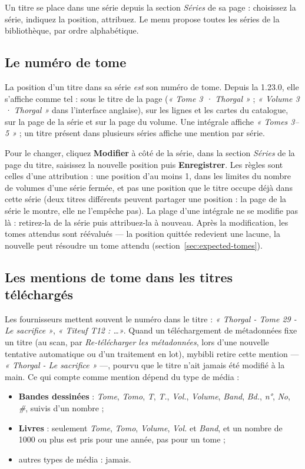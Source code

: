 Un titre se place dans une série depuis la section \emph{Séries} de sa
page : choisissez la série, indiquez la position, attribuez. Le menu
propose toutes les séries de la bibliothèque, par ordre alphabétique.

\subsection*{Le numéro de tome}

La position d'un titre dans sa série \emph{est} son numéro de tome.
Depuis la 1.23.0, elle s'affiche comme tel : sous le titre de la page
(\emph{« Tome 3 · Thorgal »} ; \emph{« Volume 3 · Thorgal »} dans
l'interface anglaise), sur les lignes et les cartes du catalogue, sur
la page de la série et sur la page du volume. Une intégrale affiche
\emph{« Tomes 3--5 »} ; un titre présent dans plusieurs séries affiche
une mention par série.

Pour le changer, cliquez \textbf{Modifier} à côté de la série, dans la
section \emph{Séries} de la page du titre, saisissez la nouvelle
position puis \textbf{Enregistrer}. Les règles sont celles d'une
attribution : une position d'au moins 1, dans les limites du nombre de
volumes d'une série fermée, et pas une position que le titre occupe
déjà dans cette série (deux titres différents peuvent partager une
position : la page de la série le montre, elle ne l'empêche pas). La
plage d'une intégrale ne se modifie pas là : retirez-la de la série
puis attribuez-la à nouveau. Après la modification, les tomes attendus
sont réévalués --- la position quittée redevient une lacune, la
nouvelle peut résoudre un tome attendu (section~\ref{sec:expected-tomes}).

\subsection*{Les mentions de tome dans les titres téléchargés}

Les fournisseurs mettent souvent le numéro dans le titre : \emph{«
Thorgal - Tome 29 - Le sacrifice »}, \emph{« Titeuf T12 : \dots »}.
Quand un téléchargement de métadonnées fixe un titre (au scan, par
\emph{Re-télécharger les métadonnées}, lors d'une nouvelle tentative
automatique ou d'un traitement en lot), mybibli retire cette
mention --- \emph{« Thorgal - Le sacrifice »}
---, pourvu que le titre n'ait jamais été modifié à la main. Ce qui
compte comme mention dépend du type de média :

\begin{itemize}
  \item \textbf{Bandes dessinées} : \emph{Tome}, \emph{Tomo}, \emph{T},
        \emph{T.}, \emph{Vol.}, \emph{Volume}, \emph{Band}, \emph{Bd.},
        \emph{n°}, \emph{No}, \emph{\#}, suivis d'un nombre ;
  \item \textbf{Livres} : seulement \emph{Tome}, \emph{Tomo},
        \emph{Volume}, \emph{Vol.} et \emph{Band}, et un nombre de 1000
        ou plus est pris pour une année, pas pour un tome ;
  \item autres types de média : jamais.
\end{itemize}

